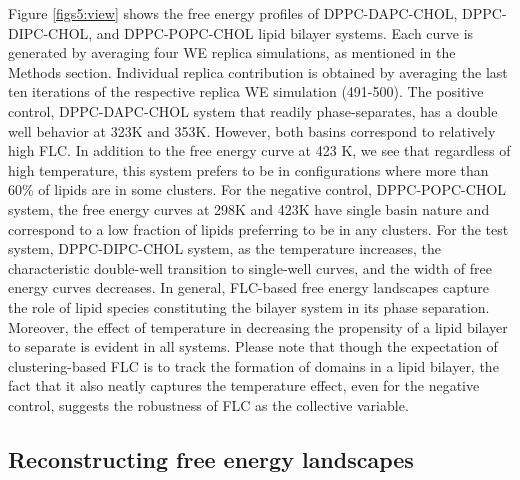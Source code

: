 \documentclass{biophys-new}
\begin{document}
Figure \ref{figs5:view} shows the free energy profiles of DPPC-DAPC-CHOL, DPPC-DIPC-CHOL, and DPPC-POPC-CHOL lipid bilayer systems.
Each curve is generated by averaging four WE replica simulations, as mentioned in the Methods section.
Individual replica contribution is obtained by averaging the last ten iterations of the respective replica WE simulation (491-500). 
The positive control, DPPC-DAPC-CHOL system that readily phase-separates, has a double well behavior at 323K and 353K.
However, both basins correspond to relatively high FLC.
In addition to the free energy curve at 423 K, we see that regardless of high temperature, this system prefers to be in configurations where more than 60\% of lipids are in some clusters.
For the negative control, DPPC-POPC-CHOL system, the free energy curves at 298K and 423K have single basin nature and correspond to a low fraction of lipids preferring to be in any clusters.
For the test system, DPPC-DIPC-CHOL system, as the temperature increases, the characteristic double-well transition to single-well curves, and the width of free energy curves decreases.
In general, FLC-based free energy landscapes capture the role of lipid species constituting the bilayer system in its phase separation.
Moreover, the effect of temperature in decreasing the propensity of a lipid bilayer to separate is evident in all systems.
Please note that though the expectation of clustering-based FLC is to track the formation of domains in a lipid bilayer, the fact that it also neatly captures the temperature effect, even for the negative control, suggests the robustness of FLC as the collective variable.

\subsection*{Reconstructing free energy landscapes}
\end{document}
